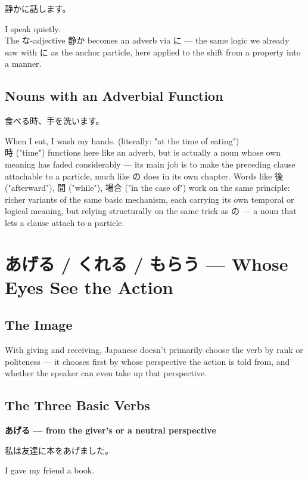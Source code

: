 \documentclass[12pt]{book}
\begin{document}
\par\quad 静かに話します。\\
\par\quad I speak quietly.\\

The な-adjective 静か becomes an adverb via に — the same logic we already saw with に as the anchor particle, here applied to the shift from a property into a manner.

\section*{Nouns with an Adverbial Function}

\par\quad 食べる時、手を洗います。\\
\par\quad When I eat, I wash my hands. (literally: "at the time of eating")\\

時 ("time") functions here like an adverb, but is actually a noun whose own meaning has faded considerably — its main job is to make the preceding clause attachable to a particle, much like の does in its own chapter. Words like 後 ("afterward"), 間 ("while"), 場合 ("in the case of") work on the same principle: richer variants of the same basic mechanism, each carrying its own temporal or logical meaning, but relying structurally on the same trick as の — a noun that lets a clause attach to a particle.


\chapter{あげる / くれる / もらう — Whose Eyes See the Action}

\section*{The Image}

With giving and receiving, Japanese doesn't primarily choose the verb by rank or politeness — it chooses first by whose perspective the action is told from, and whether the speaker can even take up that perspective.

\section*{The Three Basic Verbs}

\textbf{あげる — from the giver's or a neutral perspective}
\par\quad 私は友達に本をあげました。\\
\par\quad I gave my friend a book.\\
\end{document}
